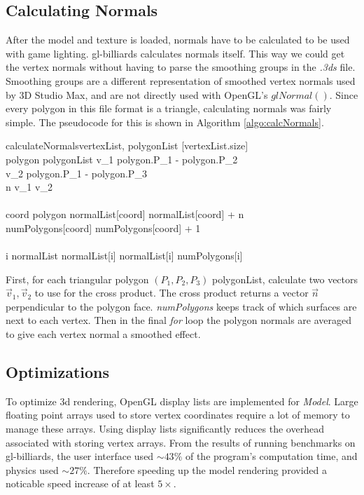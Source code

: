 	\subsection{Calculating Normals}
	After the model and texture is loaded, normals have to be calculated to be used with game lighting. gl-billiards calculates normals itself. This way 
    we could get the vertex normals without having to parse the smoothing groups in the \textit{.3ds} file. Smoothing groups are a different representation 
    of smoothed vertex normals used by 3D Studio Max, and are not directly used with OpenGL's $glNormal()$. Since every polygon in this file 
    format is a triangle, calculating normals was fairly simple. 
    The pseudocode for this is shown in Algorithm \ref{algo:calcNormals}.
	\begin{center}
	\begin{pseudocode}[framebox]{calculateNormals}{vertexList, polygonList}
	\label{algo:calcNormals}
	[vertexList.size]    \\
	\FOREACH polygon \in polygonList \DO
	\BEGIN
	\vec v_1 \gets polygon.\vec P_1 - polygon.\vec P_2  \\
	\vec v_2 \gets polygon.\vec P_1  - polygon.\vec P_3 \\
	\vec n \gets \vec v_1 \times \vec v_2 \\\\
		\FOREACH coord \in polygon \DO
		\BEGIN
            normalList[coord] \gets normalList[coord] + \vec n    \\
			numPolygons[coord] \gets numPolygons[coord] + 1
		\END
	\END
	\\  \\
	\FOREACH i \in normalList \DO
        normalList[i] \gets normalList[i] \div numPolygons[i]
    \end{pseudocode}
    \end{center}
	
    First, for each triangular polygon $(P_1, P_2, P_3)$ polygonList, calculate two vectors $\vec v_1, \vec v_2$ to use for the cross
    product. The cross product returns a vector $\vec n$ perpendicular to the polygon face. \textit{numPolygons} keeps track of which surfaces are next 
    to each vertex. Then in the final \textit{for} loop the polygon normals are averaged to give each vertex normal a smoothed effect.

	\subsection{Optimizations}
    To optimize 3d rendering, OpenGL display lists are implemented for \textit{Model}. Large floating point arrays used to store vertex coordinates 
    require a lot of memory to manage these arrays. Using display lists significantly reduces the overhead associated with storing vertex arrays. 
    From the results of running benchmarks on gl-billiards, the user interface used $\sim43\%$ of the program's computation time, and
    physics used $\sim27\%$. Therefore speeding up the model rendering provided a noticable speed increase of at least $5\times$.

